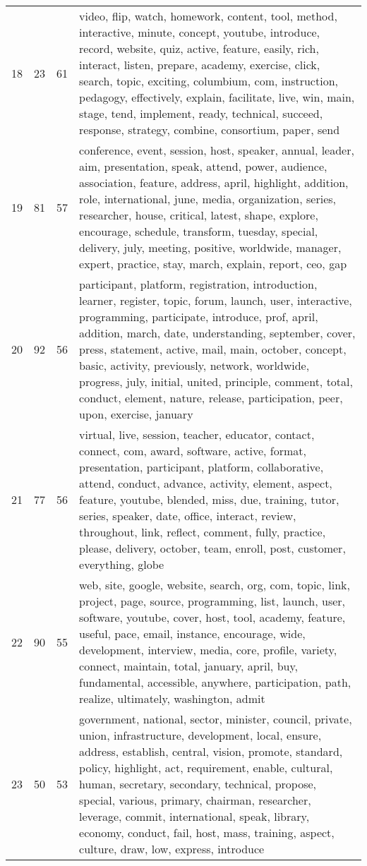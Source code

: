 \begin{table}[ht]
{\begin{tabularx}{\textwidth}{llrX}
   18 & 23 & 61 & video, flip, watch, homework, content, tool, method, interactive, minute, concept, youtube, introduce, record, website, quiz, active, feature, easily, rich, interact, listen, prepare, academy, exercise, click, search, topic, exciting, columbium, com, instruction, pedagogy, effectively, explain, facilitate, live, win, main, stage, tend, implement, ready, technical, succeed, response, strategy, combine, consortium, paper, send \\ 
   19 & 81 & 57 & conference, event, session, host, speaker, annual, leader, aim, presentation, speak, attend, power, audience, association, feature, address, april, highlight, addition, role, international, june, media, organization, series, researcher, house, critical, latest, shape, explore, encourage, schedule, transform, tuesday, special, delivery, july, meeting, positive, worldwide, manager, expert, practice, stay, march, explain, report, ceo, gap \\ 
   20 & 92 & 56 & participant, platform, registration, introduction, learner, register, topic, forum, launch, user, interactive, programming, participate, introduce, prof, april, addition, march, date, understanding, september, cover, press, statement, active, mail, main, october, concept, basic, activity, previously, network, worldwide, progress, july, initial, united, principle, comment, total, conduct, element, nature, release, participation, peer, upon, exercise, january \\ 
   21 & 77 & 56 & virtual, live, session, teacher, educator, contact, connect, com, award, software, active, format, presentation, participant, platform, collaborative, attend, conduct, advance, activity, element, aspect, feature, youtube, blended, miss, due, training, tutor, series, speaker, date, office, interact, review, throughout, link, reflect, comment, fully, practice, please, delivery, october, team, enroll, post, customer, everything, globe \\ 
   22 & 90 & 55 & web, site, google, website, search, org, com, topic, link, project, page, source, programming, list, launch, user, software, youtube, cover, host, tool, academy, feature, useful, pace, email, instance, encourage, wide, development, interview, media, core, profile, variety, connect, maintain, total, january, april, buy, fundamental, accessible, anywhere, participation, path, realize, ultimately, washington, admit \\ 
   23 & 50 & 53 & government, national, sector, minister, council, private, union, infrastructure, development, local, ensure, address, establish, central, vision, promote, standard, policy, highlight, act, requirement, enable, cultural, human, secretary, secondary, technical, propose, special, various, primary, chairman, researcher, leverage, commit, international, speak, library, economy, conduct, fail, host, mass, training, aspect, culture, draw, low, express, introduce \\ 

\end{tabularx}}
\end{table}
